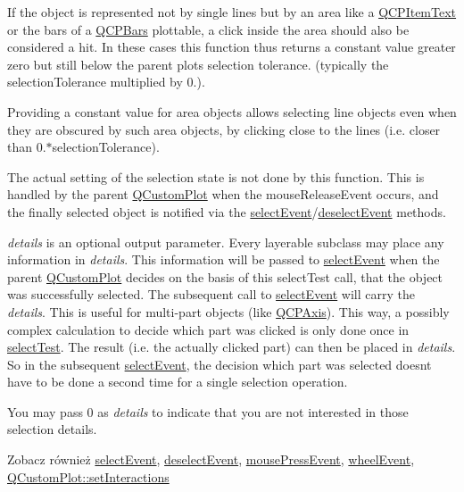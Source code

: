 If the object is represented not by single lines but by an area like a \hyperlink{class_q_c_p_item_text}{Q\+C\+P\+Item\+Text} or the bars of a \hyperlink{class_q_c_p_bars}{Q\+C\+P\+Bars} plottable, a click inside the area should also be considered a hit. In these cases this function thus returns a constant value greater zero but still below the parent plot\textquotesingle{}s selection tolerance. (typically the selection\+Tolerance multiplied by 0.).

Providing a constant value for area objects allows selecting line objects even when they are obscured by such area objects, by clicking close to the lines (i.\+e. closer than 0.$\ast$selection\+Tolerance).

The actual setting of the selection state is not done by this function. This is handled by the parent \hyperlink{class_q_custom_plot}{Q\+Custom\+Plot} when the mouse\+Release\+Event occurs, and the finally selected object is notified via the \hyperlink{class_q_c_p_abstract_plottable_a2d488568cf16600dd81fa23d7d439829}{select\+Event}/\hyperlink{class_q_c_p_abstract_plottable_a9b104d9da4f38f934363945c313bf82e}{deselect\+Event} methods.

{\itshape details} is an optional output parameter. Every layerable subclass may place any information in {\itshape details}. This information will be passed to \hyperlink{class_q_c_p_abstract_plottable_a2d488568cf16600dd81fa23d7d439829}{select\+Event} when the parent \hyperlink{class_q_custom_plot}{Q\+Custom\+Plot} decides on the basis of this select\+Test call, that the object was successfully selected. The subsequent call to \hyperlink{class_q_c_p_abstract_plottable_a2d488568cf16600dd81fa23d7d439829}{select\+Event} will carry the {\itshape details}. This is useful for multi-\/part objects (like \hyperlink{class_q_c_p_axis}{Q\+C\+P\+Axis}). This way, a possibly complex calculation to decide which part was clicked is only done once in \hyperlink{class_q_c_p_error_bars_ac1b6675ef43e32547a3cbcf7b7ac46ed}{select\+Test}. The result (i.\+e. the actually clicked part) can then be placed in {\itshape details}. So in the subsequent \hyperlink{class_q_c_p_abstract_plottable_a2d488568cf16600dd81fa23d7d439829}{select\+Event}, the decision which part was selected doesn\textquotesingle{}t have to be done a second time for a single selection operation.

You may pass 0 as {\itshape details} to indicate that you are not interested in those selection details.

\begin{DoxySeeAlso}{Zobacz również}
\hyperlink{class_q_c_p_abstract_plottable_a2d488568cf16600dd81fa23d7d439829}{select\+Event}, \hyperlink{class_q_c_p_abstract_plottable_a9b104d9da4f38f934363945c313bf82e}{deselect\+Event}, \hyperlink{class_q_c_p_layerable_af6567604818db90f4fd52822f8bc8376}{mouse\+Press\+Event}, \hyperlink{class_q_c_p_layerable_a47dfd7b8fd99c08ca54e09c362b6f022}{wheel\+Event}, \hyperlink{class_q_custom_plot_a5ee1e2f6ae27419deca53e75907c27e5}{Q\+Custom\+Plot\+::set\+Interactions} 
\end{DoxySeeAlso}


